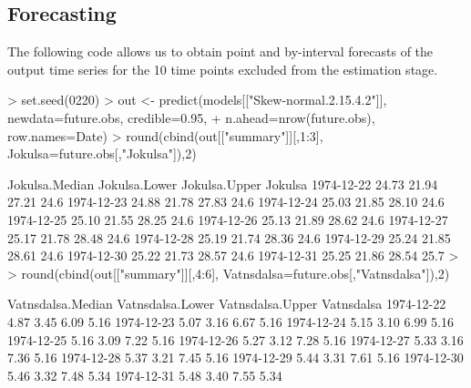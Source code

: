 \subsection{Forecasting}
The following code allows us to obtain point and by-interval forecasts of the output time series for the 10 time points excluded from the estimation stage.
\begin{example}
> set.seed(0220)
> out <- predict(models[["Skew-normal.2.15.4.2"]], newdata=future.obs, credible=0.95,
+                n.ahead=nrow(future.obs), row.names=Date)
> round(cbind(out[["summary"]][,1:3], Jokulsa=future.obs[,"Jokulsa"]),2)

           Jokulsa.Median Jokulsa.Lower Jokulsa.Upper Jokulsa
1974-12-22          24.73         21.94         27.21    24.6
1974-12-23          24.88         21.78         27.83    24.6
1974-12-24          25.03         21.85         28.10    24.6
1974-12-25          25.10         21.55         28.25    24.6
1974-12-26          25.13         21.89         28.62    24.6
1974-12-27          25.17         21.78         28.48    24.6
1974-12-28          25.19         21.74         28.36    24.6
1974-12-29          25.24         21.85         28.61    24.6
1974-12-30          25.22         21.73         28.57    24.6
1974-12-31          25.25         21.86         28.54    25.7
>
> round(cbind(out[["summary"]][,4:6], Vatnsdalsa=future.obs[,"Vatnsdalsa"]),2)

           Vatnsdalsa.Median Vatnsdalsa.Lower Vatnsdalsa.Upper Vatnsdalsa
1974-12-22              4.87             3.45             6.09       5.16
1974-12-23              5.07             3.16             6.67       5.16
1974-12-24              5.15             3.10             6.99       5.16
1974-12-25              5.16             3.09             7.22       5.16
1974-12-26              5.27             3.12             7.28       5.16
1974-12-27              5.33             3.16             7.36       5.16
1974-12-28              5.37             3.21             7.45       5.16
1974-12-29              5.44             3.31             7.61       5.16
1974-12-30              5.46             3.32             7.48       5.34
1974-12-31              5.48             3.40             7.55       5.34
\end{example}

